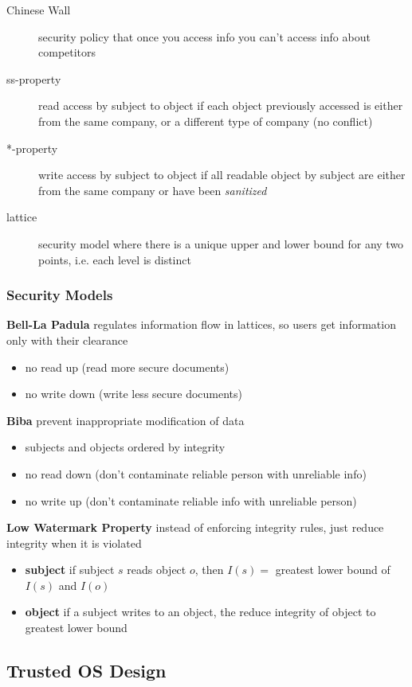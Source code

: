 \documentclass[]{article}
\theoremstyle{definition}
\begin{document}
	\begin{description}
		\item[Chinese Wall] security policy that once you access info you can't access info about competitors
		\item[ss-property] read access by subject to object if each object previously accessed is either from the same company, or a different type of company (no conflict)
		\item[*-property] write access by subject to object if all readable object by subject are either from the same company or have been \textit{sanitized} 
		\item[lattice] security model where there is a unique upper and lower bound for any two points, i.e. each level is distinct
	\end{description}

	\subsubsection{Security Models}
	\textbf{Bell-La Padula} regulates information flow in lattices, so users get information only with their clearance
	\begin{itemize}
		\item no read up (read more secure documents)
		\item no write down (write less secure documents)
	\end{itemize}
	\textbf{Biba} prevent inappropriate modification of data
	\begin{itemize}
		\item subjects and objects ordered by integrity
		\item no read down (don't contaminate reliable person with unreliable info)
		\item no write up (don't contaminate reliable info with unreliable person)
	\end{itemize}
	\textbf{Low Watermark Property} instead of enforcing integrity rules, just reduce integrity when it is violated
	\begin{itemize}
		\item \textbf{subject} if subject $s$ reads object $o$, then $I(s) = $ greatest lower bound of $I(s)$ and $I(o)$
		\item \textbf{object} if a subject writes to an object, the reduce integrity of object to greatest lower bound
	\end{itemize}

	\subsection{Trusted OS Design}
\end{document}
